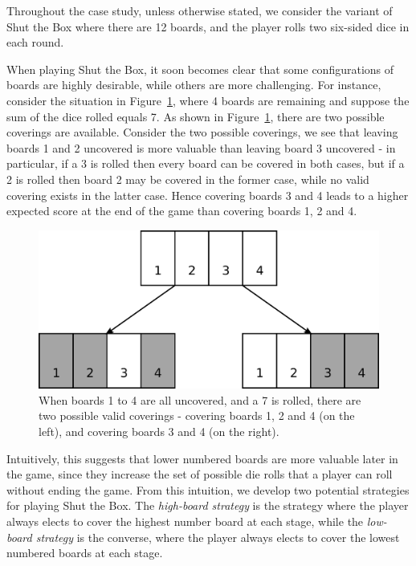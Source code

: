 Throughout the case study, unless otherwise stated, we consider the variant of Shut the Box where there are 12 boards, and the player rolls two six-sided dice in each round.

When playing Shut the Box, it soon becomes clear that some configurations of boards are highly desirable, while others are more challenging. For instance, consider the situation in Figure~\ref{cs1:cover_choice}, where 4 boards are remaining and suppose the sum of the dice rolled equals 7. As shown in Figure~\ref{cs1:cover_choice}, there are two possible coverings are available. Consider the two possible coverings, we see that leaving boards 1 and 2 uncovered is more valuable than leaving board 3 uncovered - in particular, if a 3 is rolled then every board can be covered in both cases, but if a 2 is rolled then board 2 may be covered in the former case, while no valid covering exists in the latter case. Hence covering boards 3 and 4 leads to a higher expected score at the end of the game than covering boards 1, 2 and 4.

\begin{figure}
    \centering
    \includegraphics[width=\textwidth]{images/cover_choice.pdf}
    \caption{When boards 1 to 4 are all uncovered, and a 7 is rolled, there are two possible valid coverings - covering boards 1, 2 and 4 (on the left), and covering boards 3 and 4 (on the right).}
    \label{cs1:cover_choice}
\end{figure}

Intuitively, this suggests that lower numbered boards are more valuable later in the game, since they increase the set of possible die rolls that a player can roll without ending the game. From this intuition, we develop two potential strategies for playing Shut the Box. The \emph{high-board strategy} is the strategy where the player always elects to cover the highest number board at each stage, while the \emph{low-board strategy} is the converse, where the player always elects to cover the lowest numbered boards at each stage.

